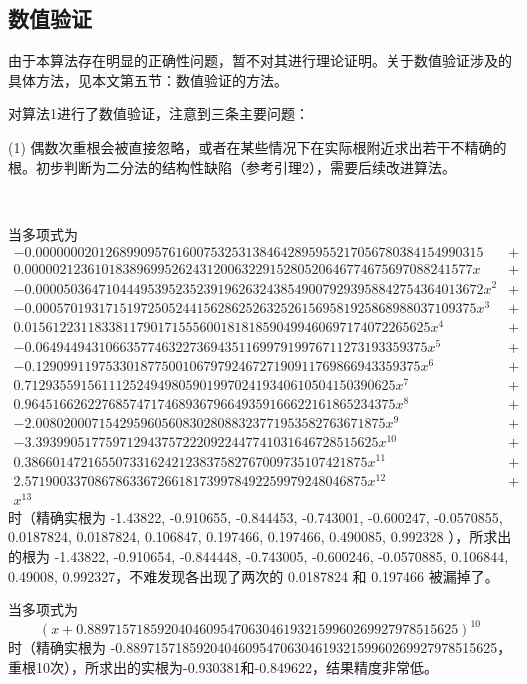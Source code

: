 \subsection{数值验证}

由于本算法存在明显的正确性问题，暂不对其进行理论证明。关于数值验证涉及的具体方法，见本文第五节：数值验证的方法。

对算法1进行了数值验证，注意到三条主要问题：

(1) 偶数次重根会被直接忽略，或者在某些情况下在实际根附近求出若干不精确的根。初步判断为二分法的结构性缺陷（参考引理2），需要后续改进算法。

\begin{example}[]~
	
	当多项式为
	$$
	\begin{aligned}
	-0.0000000201268990957616007532531384642895955217056780384154990315 & + \\ 0.0000021236101838969952624312006322915280520646774675697088241577x & + \\ -0.0000503647104449539523523919626324385490079293958842754364013672x^2 & + \\ -0.000570193171519725052441562862526325261569581925868988037109375x^3 & + \\ 0.0156122311833811790171555600181818590499460697174072265625x^4 & + \\ -0.06494494310663577463227369435116997919976711273193359375x^5 & + \\ -0.1290991197533018775001067979246727190911769866943359375x^6 & + \\ 0.71293559156111252494980590199702419340610504150390625x^7 & + \\ 0.96451662622768574717468936796649359166622161865234375x^8 & + \\ -2.00802000715429596056083028088323771953582763671875x^9 & + \\ -3.3939905177597129437572220922447741031646728515625x^{10} & + \\ 0.3866014721655073316242123837582767009735107421875x^{11} & + \\ 2.5719003370867863367266181739978492259979248046875x^{12} & + \\ 
	x^{13}
	\end{aligned}
	$$ 
	时（精确实根为 -1.43822, -0.910655, -0.844453, -0.743001, -0.600247, -0.0570855, 0.0187824, 0.0187824, 0.106847, 0.197466, 0.197466, 0.490085, 0.992328 ），所求出的根为 -1.43822, -0.910654, -0.844448, -0.743005, -0.600246, -0.0570885, 0.106844, 0.49008, 0.992327，不难发现各出现了两次的 0.0187824 和 0.197466 被漏掉了。

	当多项式为
	$$
	(x + 0.88971571859204046095470630461932159960269927978515625)^{10}
	$$
	时（精确实根为 -0.88971571859204046095470630461932159960269927978515625，重根10次），所求出的实根为-0.930381和-0.849622，结果精度非常低。 
	

\end{example}

